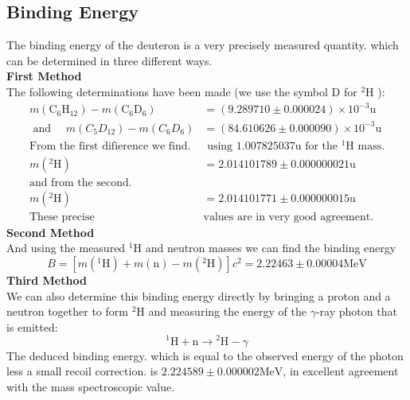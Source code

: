 \subsection{Binding Energy}
The binding energy of the deuteron is a very precisely measured quantity. which can be determined in three different ways.\\
\textbf{First Method}\\
The following determinations have been made (we use the symbol $\mathrm{D}$ for ${ }^{2} \mathrm{H}$ ):
\begin{align*}
m\left(\mathrm{C}_{6} \mathrm{H}_{12}\right)-m\left(\mathrm{C}_{6} \mathrm{D}_{6}\right)&=(9.289710 \pm 0.000024) \times 10^{-3} \mathrm{u}\\
\text{ and }\quad
m\left(C_{5} D_{12}\right)-m\left(C_{6} D_{6}\right)&=(84.610626 \pm 0.000090) \times 10^{-3} \mathrm{u}\\
\text{From the first difierence we find.}&\text{ using $1.007825037 \mathrm{u}$ for the ${ }^{1} \mathrm{H}$ mass.}\\
m\left({ }^{2} \mathrm{H}\right)&=2.014101789 \pm 0.000000021 \mathrm{u}\\
\text{and from the second.}\\
m\left({ }^{2} \mathrm{H}\right)&=2.014101771 \pm 0.000000015 \mathrm{u}\\
\text{These precise }&\text{values are in very good agreement.}
\end{align*}
\textbf{Second Method}\\
 And using the measured ${ }^{1} \mathrm{H}$ and neutron masses we can find the binding energy
 $$
 B=\left[m\left({ }^{1} \mathrm{H}\right)+m(\mathrm{n})-m\left({ }^{2} \mathrm{H}\right)\right] c^{2}=2.22463 \pm 0.00004 \mathrm{MeV}
 $$
 \textbf{Third Method}\\
 We can also determine this binding energy directly by bringing a proton and a neutron together to form ${ }^{2} \mathrm{H}$ and measuring the energy of the $\gamma$-ray photon that is emitted:
 $$
 { }^{1} \mathrm{H}+\mathrm{n} \rightarrow{ }^{2} \mathrm{H}-\gamma
 $$
 The deduced binding energy. which is equal to the observed energy of the photon less a small recoil correction. is $2.224589 \pm 0.000002 \mathrm{MeV}$, in excellent agreement with the mass spectroscopic value. 
